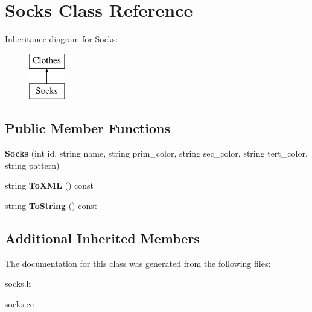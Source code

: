 \hypertarget{classSocks}{}\section{Socks Class Reference}
\label{classSocks}
Inheritance diagram for Socks\+:\begin{figure}[H]
\begin{center}
\leavevmode
\includegraphics[height=2.000000cm]{classSocks}
\end{center}
\end{figure}
\subsection*{Public Member Functions}
\begin{DoxyCompactItemize}
\item 
\mbox{\label{classSocks_ab8f83e88b6131bbf22d75de7a41d241a}} 
{\bfseries Socks} (int id, string name, string prim\+\_\+color, string sec\+\_\+color, string tert\+\_\+color, string pattern)
\item 
\mbox{\label{classSocks_a5ecf1671277183b60f8eea7020cf32ed}} 
string {\bfseries To\+X\+ML} () const
\item 
\mbox{\label{classSocks_aad237fbcc4ccf36a2956fcdef8760683}} 
string {\bfseries To\+String} () const
\end{DoxyCompactItemize}
\subsection*{Additional Inherited Members}


The documentation for this class was generated from the following files\+:\begin{DoxyCompactItemize}
\item 
socks.\+h\item 
socks.\+cc\end{DoxyCompactItemize}
